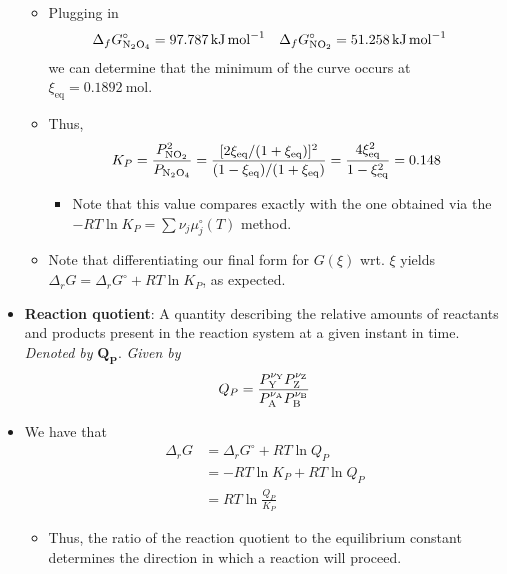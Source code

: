 \documentclass[../notes.tex]{subfiles}
\begin{document}
\begin{itemize}
\begin{itemize}
\begin{equation*}
        \end{equation*}
        \item Plugging in
        \begin{align*}
            \Delta_fG_{\ce{N2O4}}^\circ &= \SI{97.787}{\kilo\joule\per\mole}&
            \Delta_fG_{\ce{NO2}}^\circ &= \SI{51.258}{\kilo\joule\per\mole}
        \end{align*}
        we can determine that the minimum of the curve occurs at $\xi_\text{eq}=\SI{0.1892}{\mole}$.
        \item Thus,
        \begin{equation*}
            K_P = \frac{P_{\ce{NO2}}^2}{P_{\ce{N2O4}}}
            = \frac{[2\xi_\text{eq}/(1+\xi_\text{eq})]^2}{(1-\xi_\text{eq})/(1+\xi_\text{eq})}
            = \frac{4\xi_\text{eq}^2}{1-\xi_\text{eq}^2}
            = 0.148
        \end{equation*}
        \begin{itemize}
            \item Note that this value compares exactly with the one obtained via the $-RT\ln K_P=\sum\nu_j\mu_j^\circ(T)$ method.
        \end{itemize}
        \item Note that differentiating our final form for $G(\xi)$ wrt. $\xi$ yields $\Delta_rG=\Delta_rG^\circ+RT\ln K_P$, as expected.
    \end{itemize}
    \item \textbf{Reaction quotient}: A quantity describing the relative amounts of reactants and products present in the reaction system at a given instant in time. \emph{Denoted by} $\bm{Q_P}$. \emph{Given by}
    \begin{equation*}
        Q_P = \frac{P_{\ce{Y}}^{\nu_{\ce{Y}}}P_{\ce{Z}}^{\nu_{\ce{Z}}}}{P_{\ce{A}}^{\nu_{\ce{A}}}P_{\ce{B}}^{\nu_{\ce{B}}}}
    \end{equation*}
    \item We have that
    \begin{align*}
        \Delta_rG &= \Delta_rG^\circ+RT\ln Q_P\\
        &= -RT\ln K_P+RT\ln Q_P\\
        &= RT\ln\frac{Q_P}{K_P}
    \end{align*}
    \begin{itemize}
        \item Thus, the ratio of the reaction quotient to the equilibrium constant determines the direction in which a reaction will proceed.
    \end{itemize}

\end{itemize}
\end{document}
